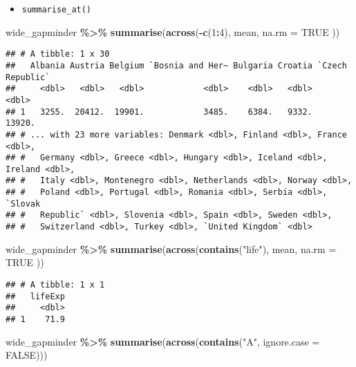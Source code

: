 \documentclass[
]{book}
\newenvironment{Shaded}{\begin{snugshade}}{\end{snugshade}}
\newcommand{\DataTypeTok}[1]{\textcolor[rgb]{0.13,0.29,0.53}{#1}}
\newcommand{\DecValTok}[1]{\textcolor[rgb]{0.00,0.00,0.81}{#1}}
\newcommand{\KeywordTok}[1]{\textcolor[rgb]{0.13,0.29,0.53}{\textbf{#1}}}
\newcommand{\NormalTok}[1]{#1}
\newcommand{\OperatorTok}[1]{\textcolor[rgb]{0.81,0.36,0.00}{\textbf{#1}}}
\newcommand{\OtherTok}[1]{\textcolor[rgb]{0.56,0.35,0.01}{#1}}
\newcommand{\StringTok}[1]{\textcolor[rgb]{0.31,0.60,0.02}{#1}}
\providecommand{\tightlist}{%
  \setlength{\itemsep}{0pt}\setlength{\parskip}{0pt}}
\begin{document}
\begin{itemize}
\tightlist
\item
  \texttt{summarise\_at()}
\end{itemize}

\begin{Shaded}
\begin{Highlighting}[]
\NormalTok{wide\_gapminder }\OperatorTok{\%\textgreater{}\%}
\StringTok{  }\KeywordTok{summarise}\NormalTok{(}\KeywordTok{across}\NormalTok{(}\OperatorTok{{-}}\KeywordTok{c}\NormalTok{(}\DecValTok{1}\OperatorTok{:}\DecValTok{4}\NormalTok{),}
\NormalTok{    mean,}
    \DataTypeTok{na.rm =} \OtherTok{TRUE}
\NormalTok{  ))}
\end{Highlighting}
\end{Shaded}

\begin{verbatim}
## # A tibble: 1 x 30
##   Albania Austria Belgium `Bosnia and Her~ Bulgaria Croatia `Czech Republic`
##     <dbl>   <dbl>   <dbl>            <dbl>    <dbl>   <dbl>            <dbl>
## 1   3255.  20412.  19901.            3485.    6384.   9332.           13920.
## # ... with 23 more variables: Denmark <dbl>, Finland <dbl>, France <dbl>,
## #   Germany <dbl>, Greece <dbl>, Hungary <dbl>, Iceland <dbl>, Ireland <dbl>,
## #   Italy <dbl>, Montenegro <dbl>, Netherlands <dbl>, Norway <dbl>,
## #   Poland <dbl>, Portugal <dbl>, Romania <dbl>, Serbia <dbl>, `Slovak
## #   Republic` <dbl>, Slovenia <dbl>, Spain <dbl>, Sweden <dbl>,
## #   Switzerland <dbl>, Turkey <dbl>, `United Kingdom` <dbl>
\end{verbatim}

\begin{Shaded}
\begin{Highlighting}[]
\NormalTok{wide\_gapminder }\OperatorTok{\%\textgreater{}\%}
\StringTok{  }\KeywordTok{summarise}\NormalTok{(}\KeywordTok{across}\NormalTok{(}\KeywordTok{contains}\NormalTok{(}\StringTok{"life"}\NormalTok{),}
\NormalTok{    mean,}
    \DataTypeTok{na.rm =} \OtherTok{TRUE}
\NormalTok{  ))}
\end{Highlighting}
\end{Shaded}

\begin{verbatim}
## # A tibble: 1 x 1
##   lifeExp
##     <dbl>
## 1    71.9
\end{verbatim}

\begin{Shaded}
\begin{Highlighting}[]
\NormalTok{wide\_gapminder }\OperatorTok{\%\textgreater{}\%}
\StringTok{  }\KeywordTok{summarise}\NormalTok{(}\KeywordTok{across}\NormalTok{(}\KeywordTok{contains}\NormalTok{(}\StringTok{"A"}\NormalTok{, }\DataTypeTok{ignore.case =} \OtherTok{FALSE}\NormalTok{)))}
\end{Highlighting}
\end{Shaded}
\end{document}

